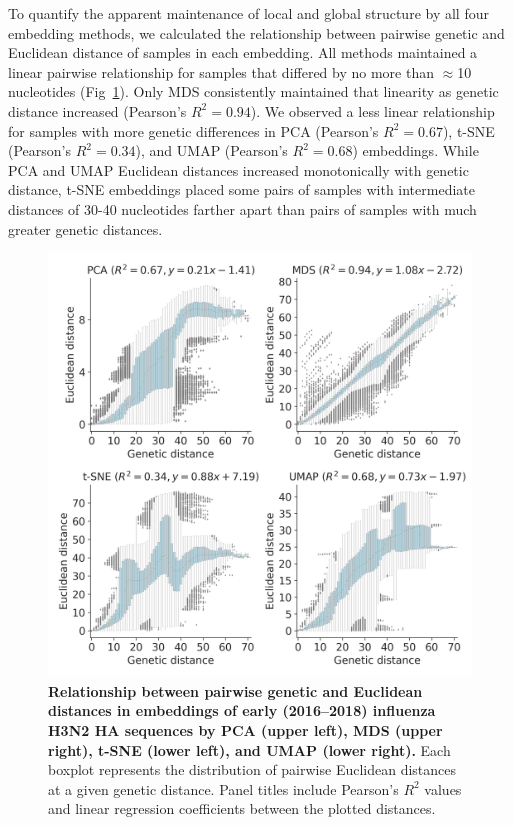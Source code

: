 \documentclass[10pt,letterpaper]{article}
\begin{document}
To quantify the apparent maintenance of local and global structure by all four embedding methods, we calculated the relationship between pairwise genetic and Euclidean distance of samples in each embedding.
All methods maintained a linear pairwise relationship for samples that differed by no more than $\approx$10 nucleotides (Fig~\ref{fig:seasonal-influenza-h3n2-ha-pairwise-distances}).
Only MDS consistently maintained that linearity as genetic distance increased (Pearson's $R^{2} = 0.94$).
We observed a less linear relationship for samples with more genetic differences in PCA (Pearson's $R^{2} = 0.67$), t-SNE (Pearson's $R^{2} = 0.34$), and UMAP (Pearson's $R^{2} = 0.68$) embeddings.
While PCA and UMAP Euclidean distances increased monotonically with genetic distance, t-SNE embeddings placed some pairs of samples with intermediate distances of 30-40 nucleotides farther apart than pairs of samples with much greater genetic distances.

\begin{figure}[!h]
\includegraphics[width=\columnwidth]{figures/flu-2016-2018-ha-euclidean-distance-by-genetic-distance.png}
\caption{{\bf Relationship between pairwise genetic and Euclidean distances in embeddings of early (2016--2018) influenza H3N2 HA sequences by PCA (upper left), MDS (upper right), t-SNE (lower left), and UMAP (lower right).}
  Each boxplot represents the distribution of pairwise Euclidean distances at a given genetic distance.
  Panel titles include Pearson's $R^{2}$ values and linear regression coefficients between the plotted distances.
}
\label{fig:seasonal-influenza-h3n2-ha-pairwise-distances}
\end{figure}
\end{document}
